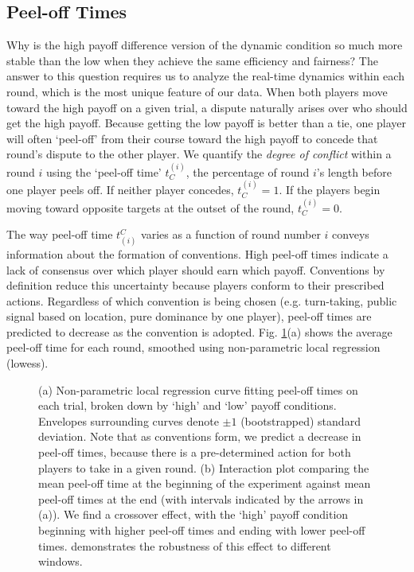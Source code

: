 \documentclass[10pt,letterpaper]{article}
\begin{document}
\subsection*{Peel-off Times} 
Why is the high payoff difference version of the dynamic condition so much more stable than the low when they achieve the same efficiency and fairness? The answer to this question requires us to analyze the real-time dynamics within each round, which is the most unique feature of our data. When both players move toward the high payoff on a given trial, a dispute naturally arises over who should get the high payoff. Because getting the low payoff is better than a tie, one player will often `peel-off' from their course toward the high payoff to concede that round's dispute to the other player. We quantify the \emph{degree of conflict} within a round $i$ using the `peel-off time' $t_C^{(i)}$, the percentage of round $i$'s length before one player peels off. If neither player concedes, $t_C^{(i)} = 1$. If the players begin moving toward opposite targets at the outset of the round, $t_C^{(i)} = 0$. 

The way peel-off time $t^C_{(i)}$ varies as a function of round number $i$ conveys information about the formation of conventions. High peel-off times indicate a lack of consensus over which player should earn which payoff. Conventions by definition reduce this uncertainty because players conform to their prescribed actions. Regardless of which convention is being chosen (e.g. turn-taking, public signal based on location, pure dominance by one player), peel-off times are predicted to decrease as the convention is adopted. Fig. \ref{Fig3}(a) shows the average peel-off time for each round, smoothed using non-parametric local regression (lowess). 

\begin{figure}[t]
\centering
\caption{(a) Non-parametric local regression curve fitting peel-off times on each trial, broken down by `high' and `low' payoff conditions. Envelopes surrounding curves denote $\pm 1$ (bootstrapped) standard deviation. Note that as conventions form, we predict a decrease in peel-off times, because there is a pre-determined action for both players to take in a given round. (b) Interaction plot comparing the mean peel-off time at the beginning of the experiment against mean peel-off times at the end (with intervals indicated by the arrows in (a)). We find a crossover effect, with the `high' payoff condition beginning with higher peel-off times and ending with lower peel-off times.  demonstrates the robustness of this effect to different windows.}
\label{Fig3}
\end{figure}
\end{document}

